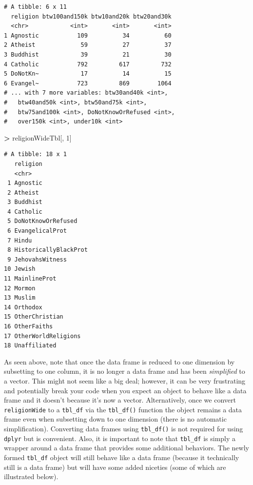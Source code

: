 \documentclass[]{krantz}
\makeatletter
\newenvironment{Shaded}{\begin{snugshade}}{\end{snugshade}}
\newcommand{\DecValTok}[1]{\textcolor[rgb]{0.06,0.06,0.06}{#1}}
\newcommand{\NormalTok}[1]{#1}
\newcommand{\OperatorTok}[1]{\textcolor[rgb]{0.43,0.43,0.43}{\textbf{#1}}}
\newcommand{\StringTok}[1]{\textcolor[rgb]{0.5,0.5,0.5}{#1}}
\newenvironment{kframe}{%
\medskip{}
\setlength{\fboxsep}{.8em}
 \def\at@end@of@kframe{}%
 \ifinner\ifhmode%
  \def\at@end@of@kframe{\end{minipage}}%
  \begin{minipage}{\columnwidth}%
 \fi\fi%
 \def\FrameCommand##1{\hskip\@totalleftmargin \hskip-\fboxsep
 \colorbox{shadecolor}{##1}\hskip-\fboxsep
     \hskip-\linewidth \hskip-\@totalleftmargin \hskip\columnwidth}%
 \MakeFramed {\advance\hsize-\width
   \@totalleftmargin\z@ \linewidth\hsize
   \@setminipage}}%
 {\par\unskip\endMakeFramed%
 \at@end@of@kframe}
\renewenvironment{Shaded}{\begin{kframe}}{\end{kframe}}
\makeatother
\begin{document}
\begin{verbatim}
# A tibble: 6 x 11
  religion btw100and150k btw10and20k btw20and30k
  <chr>            <int>       <int>       <int>
1 Agnostic           109          34          60
2 Atheist             59          27          37
3 Buddhist            39          21          30
4 Catholic           792         617         732
5 DoNotKn~            17          14          15
6 Evangel~           723         869        1064
# ... with 7 more variables: btw30and40k <int>,
#   btw40and50k <int>, btw50and75k <int>,
#   btw75and100k <int>, DoNotKnowOrRefused <int>,
#   over150k <int>, under10k <int>
\end{verbatim}

\begin{Shaded}
\begin{Highlighting}[]
\OperatorTok{>}\StringTok{ }\NormalTok{religionWideTbl[, }\DecValTok{1}\NormalTok{]}
\end{Highlighting}
\end{Shaded}

\begin{verbatim}
# A tibble: 18 x 1
   religion             
   <chr>                
 1 Agnostic             
 2 Atheist              
 3 Buddhist             
 4 Catholic             
 5 DoNotKnowOrRefused   
 6 EvangelicalProt      
 7 Hindu                
 8 HistoricallyBlackProt
 9 JehovahsWitness      
10 Jewish               
11 MainlineProt         
12 Mormon               
13 Muslim               
14 Orthodox             
15 OtherChristian       
16 OtherFaiths          
17 OtherWorldReligions  
18 Unaffiliated         
\end{verbatim}

As seen above, note that once the data frame is reduced to one dimension by subsetting to one column, it is no longer a data frame and has been \emph{simplified} to a vector. This might not seem like a big deal; however, it can be very frustrating and potentially break your code when you expect an object to behave like a data frame and it doesn't because it's now a vector. Alternatively, once we convert \texttt{religionWide} to a \texttt{tbl\_df} via the \texttt{tbl\_df()} function the object remains a data frame even when subsetting down to one dimension (there is no automatic simplification). Converting data frames using \texttt{tbl\_df()} is not required for using \texttt{dplyr} but is convenient. Also, it is important to note that \texttt{tbl\_df} is simply a wrapper around a data frame that provides some additional behaviors. The newly formed \texttt{tbl\_df} object will still behave like a data frame (because it technically still is a data frame) but will have some added niceties (some of which are illustrated below).
\end{document}
